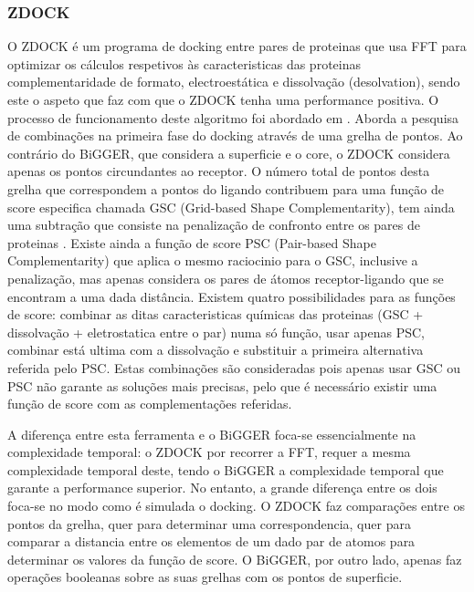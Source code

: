 \subsubsection{ZDOCK}
O ZDOCK é um programa de docking entre pares de proteinas que usa FFT para optimizar os cálculos respetivos às caracteristicas das proteinas complementaridade de formato, electroestática e dissolvação (desolvation), sendo este o aspeto que faz com que o ZDOCK tenha uma performance positiva. O processo de funcionamento deste algoritmo foi abordado em \cite{zdock}.
Aborda a pesquisa de combinações na primeira fase do docking através de uma grelha de pontos. Ao contrário do BiGGER, que considera a superficie e o core, o ZDOCK considera apenas os pontos circundantes ao receptor. O número total de pontos desta grelha que correspondem a pontos do ligando contribuem para uma função de score especifica chamada GSC (Grid-based Shape Complementarity), tem ainda uma subtração que consiste na penalização de confronto entre os pares de proteinas \cite{chen2002docking}. Existe ainda a função de score PSC (Pair-based Shape Complementarity) que aplica o mesmo raciocinio para o GSC, inclusive a penalização, mas apenas considera os pares de átomos receptor-ligando que se encontram a uma dada distância.
Existem quatro possibilidades para as funções de score: combinar as ditas caracteristicas químicas das proteinas (GSC + dissolvação + eletrostatica entre o par) numa só função, usar apenas PSC, combinar está ultima com a dissolvação e substituir a primeira alternativa referida pelo PSC. Estas combinações são consideradas pois apenas usar GSC ou PSC não garante as soluções mais precisas, pelo que é necessário existir uma função de score com as complementações referidas. \par
A diferença entre esta ferramenta e o BiGGER foca-se essencialmente na complexidade temporal: o ZDOCK por recorrer a FFT, requer a mesma complexidade temporal deste, tendo o BiGGER a complexidade temporal que garante a performance superior.
No entanto, a grande diferença entre os dois foca-se no modo como é simulada o docking. O ZDOCK faz comparações entre os pontos da grelha, quer para determinar uma correspondencia, quer para comparar a distancia entre os elementos de um dado par de atomos  para determinar os valores da função de score. O BiGGER, por outro lado, apenas faz operações booleanas sobre as suas grelhas com os pontos de superficie.  

